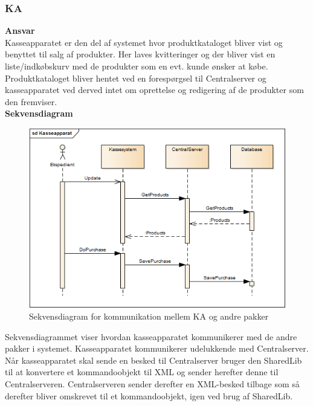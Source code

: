 \subsubsection{\gls{KA}}

\textbf{Ansvar} \\
Kasseapparatet er den del af systemet hvor produktkataloget bliver vist og benyttet til salg af produkter. Her laves kvitteringer og der bliver vist en liste/indkøbskurv med de produkter som en evt. kunde ønsker at købe. Produktkataloget bliver hentet ved en forespørgsel til Centralserver og kasseapparatet ved derved intet om oprettelse og redigering af de produkter som den fremviser. \\

\textbf{Sekvensdiagram}
\begin{figure}[H]
	\centering
	\includegraphics[scale=0.7]{Systemarkitektur/LogiskView/Kasseapparat-sekvensdiagram}
	\caption{Sekvensdiagram for kommunikation mellem \gls{KA} og andre pakker}
	\label{fig:logview_kasse_sekvensdiagram}
\end{figure}

Sekvensdiagrammet viser hvordan kasseapparatet kommunikerer med de andre pakker i systemet. Kasseapparatet kommunikerer udelukkende med Centralserver. Når kasseapparatet skal sende en besked til Centralserver bruger den SharedLib til at konvertere et kommandoobjekt til XML og sender herefter denne til Centralserveren. Centralserveren sender derefter en XML-besked tilbage som så derefter bliver omskrevet til et kommandoobjekt, igen ved brug af SharedLib.

\newpage
